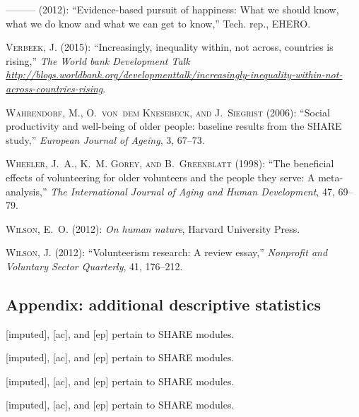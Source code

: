 \documentclass[10pt, letterpaper]{article}
\begin{document}
\begin{spacing}{1.4}
\begin{thebibliography}{87}
---\hspace{-.1pt}---\hspace{-.1pt}--- (2012): \enquote{Evidence-based pursuit
  of happiness: What we should know, what we do know and what we can get to
  know,} Tech. rep., EHERO.

\textsc{Verbeek, J.} (2015): \enquote{Increasingly, inequality within, not
  across, countries is rising,} \emph{The World bank Development Talk
  \url{http://blogs.worldbank.org/developmenttalk/increasingly-inequality-within-not-across-countries-rising}}.

\textsc{Wahrendorf, M., O.~von~dem Knesebeck, and J.~Siegrist} (2006):
  \enquote{Social productivity and well-being of older people: baseline results
  from the SHARE study,} \emph{European Journal of Ageing}, 3, 67--73.

\textsc{Wheeler, J.~A., K.~M. Gorey, and B.~Greenblatt} (1998): \enquote{The
  beneficial effects of volunteering for older volunteers and the people they
  serve: A meta-analysis,} \emph{The International Journal of Aging and Human
  Development}, 47, 69--79.

\textsc{Wilson, E.~O.} (2012{}): \emph{On human nature}, Harvard
  University Press.

\textsc{Wilson, J.} (2012{}): \enquote{Volunteerism research: A
  review essay,} \emph{Nonprofit and Voluntary Sector Quarterly}, 41, 176--212.

\end{thebibliography}


\begin{spacing}{.9}

\section{Appendix: additional descriptive statistics}

 
{\footnotesize [imputed], [ac], and [ep] pertain to SHARE modules.}
 
{\footnotesize [imputed], [ac], and [ep] pertain to SHARE modules.}
 
{\footnotesize [imputed], [ac], and [ep] pertain to SHARE modules.}
 
{\footnotesize [imputed], [ac], and [ep] pertain to SHARE modules.}


\end{spacing}
\end{spacing}
\end{document}
